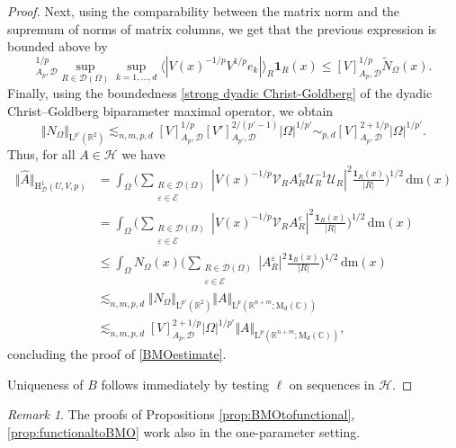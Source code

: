 \documentclass{article}
\theoremstyle{definition}
\theoremstyle{remark}
\newtheorem{remark}[theorem]{Remark}
\numberwithin{equation}{section}
\newcommand{\mathdm}{\,\mathrm{dm}}
\newcommand{\cE}{\mathcal{E}}
\newcommand{\cH}{\mathcal{H}}
\newcommand{\cU}{\mathcal{U}}
\newcommand{\cV}{\mathcal{V}}
\newcommand{\bfD}{\bm{\mathcal{D}}}
\newcommand{\e}{\varepsilon}
\newcommand{\reals}{\mathbb{R}}
\newcommand{\complex}{\mathbb{C}}
\newcommand{\Lp}[1]{\mathrm{L}^{#1}}
\newcommand{\1}{\mathbf{1}}
\begin{document}
\begin{proof}
        Next, using the comparability between the matrix norm and the supremum of norms of matrix columns, we get that the previous expression is bounded above by
        \begin{equation*}
            [V]_{A_p,\bfD}^{1/p}
            \sup_{R\in\bfD(\Omega)} \sup_{k=1,\ldots,d} \langle|V(x)^{-1/p}V^{1/p} e_k|\rangle_R \1_R(x)
            \leq [V]_{A_p,\bfD}^{1/p}\widetilde{N}_{\Omega}(x).
        \end{equation*}
        Finally, using the boundedness \eqref{strong dyadic Christ-Goldberg} of the dyadic Christ--Goldberg biparameter maximal operator,
        we obtain
        \begin{equation*}
            \Vert N_{\Omega}\Vert_{\Lp{p'}(\reals^2)}\lesssim_{n,m,p,d}[V]_{A_p,\bfD}^{1/p}[V']_{A_{p'},\bfD}^{2/(p'-1)}|\Omega|^{1/p'}\sim_{p,d}[V]_{A_{p},\bfD}^{2+1/p}|\Omega|^{1/p'}.
        \end{equation*}
        Thus, for all $A\in\cH$ we have
        \begin{align*}
            \Vert\hat{A}\Vert_{\mathrm{H}^1_{\bfD}(U,V,p)}&=\int_{\Omega}\bigg(\sum_{\substack{R\in\bfD(\Omega)\\\e\in\cE}}|V(x)^{-1/p}\cV_{R}A_{R}^{\e}\cU_{R}^{-1}\cU_{R}|^2\frac{\1_{R}(x)}{|R|}\bigg)^{1/2}\mathdm(x)\\
            &=\int_{\Omega}\bigg(\sum_{\substack{R\in\bfD(\Omega)\\\e\in\cE}}|V(x)^{-1/p}\cV_{R}A_{R}^{\e}|^2\frac{\1_{R}(x)}{|R|}\bigg)^{1/2}\mathdm(x)\\
            &\leq\int_{\Omega}N_{\Omega}(x)\bigg(\sum_{\substack{R\in\bfD(\Omega)\\\e\in\cE}}|A_{R}^{\e}|^2\frac{\1_{R}(x)}{|R|}\bigg)^{1/2}\mathdm(x)\\
            &\lesssim_{n,m,p,d}\Vert N_{\Omega}\Vert_{\Lp{p'}(\reals^2)}\Vert A\Vert_{\Lp{p}(\reals^{n+m};\mathrm{M}_{d}(\complex))}\\
            &\lesssim_{n,m,p,d}[V]_{A_{p},\bfD}^{2+1/p}|\Omega|^{1/p'}\Vert A\Vert_{\Lp{p}(\reals^{n+m};\mathrm{M}_{d}(\complex))},
        \end{align*}
        concluding the proof of \eqref{BMOestimate}.

        Uniqueness of $B$ follows immediately by testing $\ell$ on sequences in $\cH.$
    \end{proof}

    \begin{remark}
    The proofs of Propositions \ref{prop:BMOtofunctional}, \ref{prop:functionaltoBMO} work also in the one-parameter setting.
    \end{remark}
\end{document}
